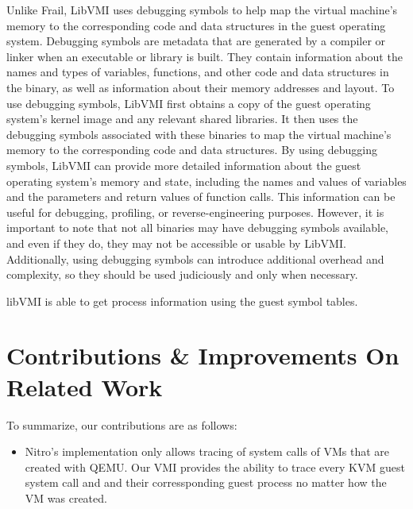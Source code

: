 \documentclass{report}
\begin{document}
\begin{spacing}{1.5}
{\large
\noindent Unlike Frail, LibVMI uses debugging symbols to help map the virtual machine's memory to the corresponding code and data structures in the guest operating system. Debugging symbols are metadata that are generated by a compiler or linker when an executable or library is built. They contain information about the names and types of variables, functions, and other code and data structures in the binary, as well as information about their memory addresses and layout. To use debugging symbols, LibVMI first obtains a copy of the guest operating system's kernel image and any relevant shared libraries. It then uses the debugging symbols associated with these binaries to map the virtual machine's memory to the corresponding code and data structures. By using debugging symbols, LibVMI can provide more detailed information about the guest operating system's memory and state, including the names and values of variables and the parameters and return values of function calls. This information can be useful for debugging, profiling, or reverse-engineering purposes. However, it is important to note that not all binaries may have debugging symbols available, and even if they do, they may not be accessible or usable by LibVMI. Additionally, using debugging symbols can introduce additional overhead and complexity, so they should be used judiciously and only when necessary.
\newline
}


{\large
libVMI is able to get process information using the guest symbol tables. 

}













\chapter{Contributions \& Improvements On Related Work}

{\large
To summarize, our contributions are as follows:

\begin{itemize}
  \item Nitro's implementation only allows tracing of system calls of VMs that are created with QEMU. Our VMI provides the ability to trace every KVM guest system call and and their corressponding guest process no matter how the VM was created.


\end{itemize}}
\end{spacing}
\end{document}
